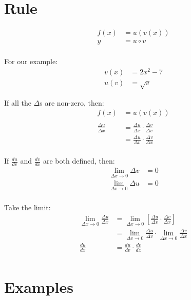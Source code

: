 \documentclass[letterpaper, landscape]{exam}
\begin{document}
  \section{Rule} %
  
  \begin{align*}
    f(x) & = u(v(x)) \\
    y    & = u \circ v \\
  \end{align*}

  For our example:
  \begin{align*}
    v(x) & = 2x^2 - 7 \\
    u(v) & = \sqrt{v}
  \end{align*}

  If all the $\Delta$s are non-zero, then:
  \begin{align*}
    f(x) &= u(v(x)) \\
    \\
    \frac{\Delta u}{\Delta x} & = \frac{\Delta u}{\Delta x} \cdot \frac{\Delta v}{\Delta v} \\
                              & = \frac{\Delta u}{\Delta v} \cdot \frac{\Delta v}{\Delta x} \\
  \end{align*}

  If $\frac{du}{dv}$ and $\frac{dv}{dx}$ are both defined, then:
  \begin{align*}
    \lim_{\Delta x \to 0} \Delta v &= 0 \\
    \lim_{\Delta v \to 0} \Delta u &= 0 \\
  \end{align*}

  Take the limit:
  \begin{align*}
    \lim_{\Delta x \to 0} \frac{\Delta u}{\Delta x} 
                  & = \lim_{\Delta x \to 0} \left[ \frac{\Delta u}{\Delta v} \cdot \frac{\Delta v}{\Delta x} \right] \\
                  & = \lim_{\Delta v \to 0} \frac{\Delta u}{\Delta v} \cdot \lim_{\Delta x \to 0} \frac{\Delta v}{\Delta x} \\
    \frac{du}{dx} & = \frac{du}{dv} \cdot \frac{dv}{dx} \\
  \end{align*}

  \section{Examples}
\end{document}
